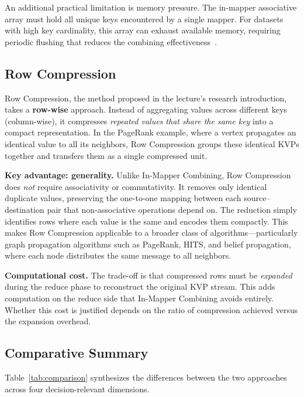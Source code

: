 \documentclass[a4paper,11pt]{article}
\begin{document}
An additional practical limitation is memory pressure. The in-mapper associative array must hold all unique keys encountered by a single mapper. For datasets with high key cardinality, this array can exhaust available memory, requiring periodic flushing that reduces the combining effectiveness~\cite{lin2010}.

\subsection{Row Compression}

Row Compression, the method proposed in the lecture's research introduction, takes a \textbf{row-wise} approach. Instead of aggregating values across different keys (column-wise), it compresses \textit{repeated values that share the same key} into a compact representation. In the PageRank example, where a vertex propagates an identical value to all its neighbors, Row Compression groups these identical KVPs together and transfers them as a single compressed unit.

\textbf{Key advantage: generality.} Unlike In-Mapper Combining, Row Compression does \textit{not} require associativity or commutativity. It removes only identical duplicate values, preserving the one-to-one mapping between each source--destination pair that non-associative operations depend on. The reduction simply identifies rows where each value is the same and encodes them compactly. This makes Row Compression applicable to a broader class of algorithms---particularly graph propagation algorithms such as PageRank, HITS, and belief propagation, where each node distributes the same message to all neighbors.

\textbf{Computational cost.} The trade-off is that compressed rows must be \textit{expanded} during the reduce phase to reconstruct the original KVP stream. This adds computation on the reduce side that In-Mapper Combining avoids entirely. Whether this cost is justified depends on the ratio of compression achieved versus the expansion overhead.

\subsection{Comparative Summary}

Table~\ref{tab:comparison} synthesizes the differences between the two approaches across four decision-relevant dimensions.
\end{document}

